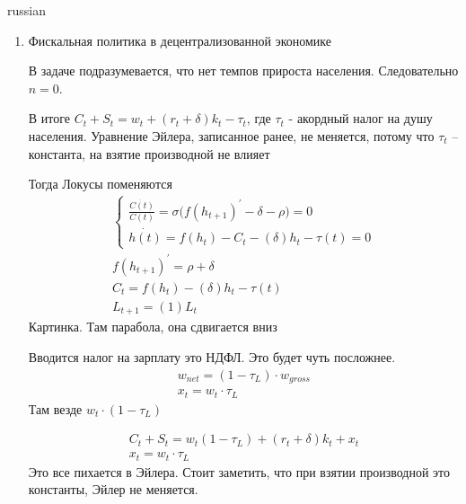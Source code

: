 \documentclass{article}
\begin{document}
\begin{otherlanguage*}{russian}
\begin{enumerate}
\begin{align*}
\ldots \\
k(t) = f(h(t)) - C(t) - (n + \delta) k_t 
\end{align*}
\begin{align*}
\begin{cases}
\frac{\dot{C(t)}}{C(t)} = \sigma \Big( f(h_{t+1})^{'} - \delta - n - \rho \Big) = 0 \\
\dot{h(t)} = f(h_t) - C_t - (n + \delta) h_t = 0 
\end{cases}
\end{align*}
Локусы (точки, которые удовлетворяют словию) 
\begin{align}
f(h_{t+1})^{'} = n + \rho + \delta \\
C_t = f(h_t) - (n + \delta) h_t \\
L_{t+1} = (1 + n) L_t 
\end{align}
(график) 
\item Фискальная политика в децентрализованной экономике

В задаче подразумевается, что нет темпов прироста населения. Следовательно $ n = 0 $. 

В итоге $ C_t + S_t = w_t + (r_t + \delta) k_t - \tau_t $, где $\tau_t$ - акордный налог на душу населения. Уравнение Эйлера, записанное ранее, не меняется, потому что $\tau_t$ -- константа, на взятие производной не влияет 

Тогда Локусы поменяются
\begin{align*}
\begin{cases}
\frac{\dot{C(t)}}{C(t)} = \sigma \Big( f(h_{t+1})^{'} - \delta - \rho \Big) = 0 \\
\dot{h(t)} = f(h_t) - C_t - ( \delta) h_t - \tau (t) = 0 
\end{cases} \\
f(h_{t+1})^{'} = \rho + \delta \\
C_t = f(h_t) - (\delta) h_t - \tau(t) \\
L_{t+1} = (1) L_t 
\end{align*}
Картинка. Там парабола, она сдвигается вниз 

Вводится налог на зарплату это НДФЛ. Это будет чуть посложнее. 
\begin{align*}
w_{net} = (1 - \tau_L ) \cdot w_{gross} \\
x_t = w_t \cdot \tau_L 
\end{align*}
Там везде $ w_t \cdot (1 - \tau_L) $ 

\begin{align}
C_t + S_t = w_t (1 - \tau_L) + (r_t + \delta) k_t + x_t \\
x_t = w_t \cdot \tau_L 
\end{align}
Это все пихается в Эйлера. Стоит заметить, что при взятии производной это константы, Эйлер не меняется. 


\end{enumerate}
\end{otherlanguage*}
\end{document}
